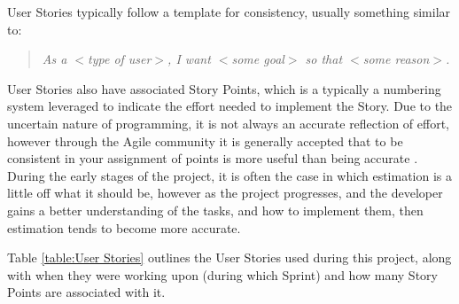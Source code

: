 User Stories typically follow a template for consistency, usually something similar to:

\begin{quotation}
  \textit{As a $<$type of user$>$, I want $<$some goal$>$ so that $<$some reason$>$.} \cite{user_story}
\end{quotation}

User Stories also have associated Story Points, which is a typically a numbering system leveraged to indicate the effort needed to implement the Story. Due to the uncertain nature of programming, it is not always an accurate reflection of effort, however through the Agile community it is generally accepted that to be consistent in your assignment of points is more useful than being accurate \cite{estimation}. During the early stages of the project, it is often the case in which estimation is a little off what it should be, however as the project progresses, and the developer gains a better understanding of the tasks, and how to implement them, then estimation tends to become more accurate.

Table \ref{table:User Stories} outlines the User Stories used during this project, along with when they were working upon (during which Sprint) and how many Story Points are associated with it.

